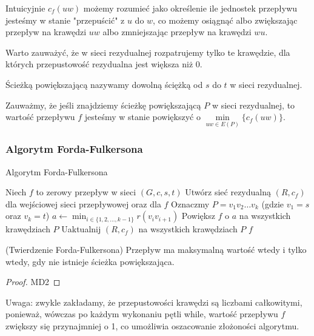 Intuicyjnie $c_f(uw)$ możemy
rozumieć jako określenie ile jednostek przepływu 
jesteśmy w stanie "przepuścić" z $u$ do $w$, co
możemy osiągnąć albo zwiększając przepływ na krawędzi $uw$
albo zmniejszając przepływ na krawędzi $wu$.

Warto zauważyć, że w sieci rezydualnej rozpatrujemy tylko te 
krawędzie, dla których przepustowość rezydualna jest większa niż 0.

\begin{defi}
	Ścieżką powiększającą nazywamy dowolną ściężką od $s$
	do $t$ w sieci rezydualnej. 
\end{defi}

Zauważmy, że jeśli znajdziemy ścieżkę powiększającą $P$ 
w sieci rezydualnej,
to wartość przepływu $f$ jesteśmy w stanie powiększyć o 
$\min\limits_{uw \in E(P)} \{c_f(uw)\}$.

\subsubsection{Algorytm Forda-Fulkersona}

\begin{algorithm}[H]
	\caption{Algorytm Forda-Fulkersona}\label{ford-fulker_alg}
	\begin{algorithmic}[1]
		\State Niech $f$ to zerowy przepływ w sieci $(G,c,s,t)$
		\State Utwórz sieć rezydualną $(R, c_f)$ dla wejściowej 
		sieci przepływowej oraz dla $f$ 
		\State Oznaczmy $P = v_1v_2\dots v_k$ (gdzie $v_1 = s$ oraz $v_k = t$)
		\State $a \gets \min_{i \in \{1, 2, \dots, k-1\}} r(v_iv_{i+1})$
		\State Powiększ $f$ o $a$ na wszystkich krawędziach $P$
		\State Uaktualnij $(R, c_f)$ na wszystkich krawędziach $P$
		\EndWhile
		\State \Return $f$
		\EndProcedure
	\end{algorithmic}
\end{algorithm}

\begin{theorem}
	(Twierdzenie Forda-Fulkersona) Przepływ ma maksymalną wartość wtedy i tylko 
	wtedy, gdy nie istnieje ścieżka powiększająca.
	\begin{proof}
		MD2
	\end{proof}
\end{theorem}

Uwaga: zwykle 
zakładamy, że przepustowości krawędzi są liczbami całkowitymi, 
ponieważ, wówczas po każdym 
wykonaniu pętli while, wartość przepływu $f$ zwiększy się
przynajmniej o 1, co umożliwia oszacowanie
złożoności algorytmu. 

